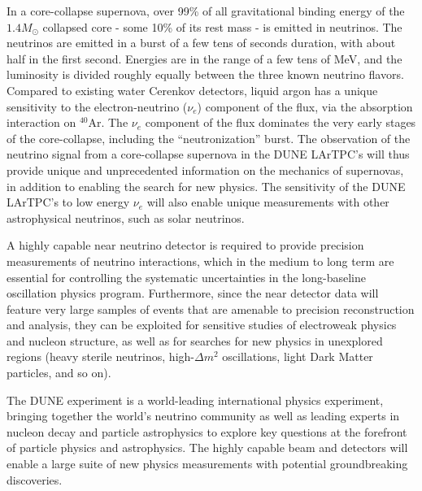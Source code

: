 In a core-collapse supernova, over 99\% of all gravitational binding
energy of the $1.4 M_{\odot}$ collapsed core - some 10\% of its rest
mass - is emitted in neutrinos.  The neutrinos are emitted in a burst
of a few tens of seconds duration, with about half in the first
second. Energies are in the range of a few tens of MeV, and the
luminosity is divided roughly equally between the three known neutrino
flavors.  Compared to existing water Cerenkov detectors, liquid argon
has a unique sensitivity to the electron-neutrino ($\nu_e$) component
of the flux, via the absorption interaction on $^{40}$Ar. The $\nu_e$
component of the flux dominates the very early stages of the
core-collapse, including the ``neutronization'' burst. The observation
of the neutrino signal from a core-collapse supernova in the DUNE
LArTPC's will thus provide unique and unprecedented information on the
mechanics of supernovas, in addition to enabling the search for new
physics. The sensitivity of the DUNE LArTPC's to low energy $\nu_e$
will also enable unique measurements with other astrophysical
neutrinos, such as solar neutrinos.

A highly capable near neutrino detector is required to provide
precision measurements of neutrino interactions, which in the medium
to long term are essential for controlling the systematic
uncertainties in the long-baseline oscillation physics
program. Furthermore, since the near detector data will feature very
large samples of events that are amenable to precision reconstruction
and analysis, they can be exploited for sensitive studies of
electroweak physics and nucleon structure, as well as for searches for
new physics in unexplored regions (heavy sterile neutrinos,
high-$\Delta m^2$ oscillations, light Dark Matter particles, and so
on).

The DUNE experiment is a world-leading international physics
experiment, bringing together the world's neutrino community as well
as leading experts in nucleon decay and particle astrophysics to
explore key questions at the forefront of particle physics and
astrophysics. The highly capable beam and detectors will enable a
large suite of new physics measurements with potential groundbreaking
discoveries.
